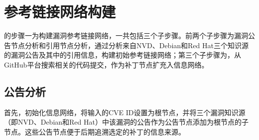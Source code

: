 
\section{参考链接网络构建}
\tool 的步骤一为构建漏洞参考链接网络，一共包括三个子步骤。前两个子步骤为漏洞公告节点分析和引用节点分析，通过分析来自NVD、Debian和Red Hat三个知识源的漏洞公告及其中的引用信息，构建初始参考链接网络；第三个子步骤为，从GitHub平台搜索相关的代码提交，作为补丁节点扩充入信息网络。

\subsection{公告分析} \label{sec:advisory analysis}
首先，\tool 初始化信息网络，将输入的CVE ID设置为根节点，并将三个漏洞知识源（即NVD、Debian和Red Hat）中该漏洞的公告作为公告节点添加为根节点的子节点。这些公告节点便于后期追溯选定的补丁的信息来源。

